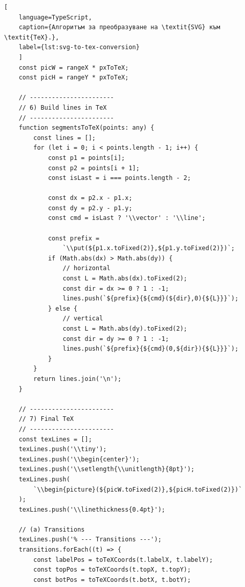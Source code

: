 \begin{lstlisting}[
	language=TypeScript,
	caption={Алгоритъм за преобразуване на \textit{SVG} към \textit{TeX}.},
	label={lst:svg-to-tex-conversion}
	]
    const picW = rangeX * pxToTeX;
    const picH = rangeY * pxToTeX;
    
    // -----------------------
    // 6) Build lines in TeX
    // -----------------------
    function segmentsToTeX(points: any) {
        const lines = [];
        for (let i = 0; i < points.length - 1; i++) {
            const p1 = points[i];
            const p2 = points[i + 1];
            const isLast = i === points.length - 2;
            
            const dx = p2.x - p1.x;
            const dy = p2.y - p1.y;
            const cmd = isLast ? '\\vector' : '\\line';
            
            const prefix = 
                `\\put(${p1.x.toFixed(2)},${p1.y.toFixed(2)})`;
            if (Math.abs(dx) > Math.abs(dy)) {
                // horizontal
                const L = Math.abs(dx).toFixed(2);
                const dir = dx >= 0 ? 1 : -1;
                lines.push(`${prefix}{${cmd}(${dir},0){${L}}}`);
            } else {
                // vertical
                const L = Math.abs(dy).toFixed(2);
                const dir = dy >= 0 ? 1 : -1;
                lines.push(`${prefix}{${cmd}(0,${dir}){${L}}}`);
            }
        }
        return lines.join('\n');
    }
    
    // -----------------------
    // 7) Final TeX
    // -----------------------
    const texLines = [];
    texLines.push('\\tiny');
    texLines.push('\\begin{center}');
    texLines.push('\\setlength{\\unitlength}{8pt}');
    texLines.push(
        `\\begin{picture}(${picW.toFixed(2)},${picH.toFixed(2)})`
    );
    texLines.push('\\linethickness{0.4pt}');
    
    // (a) Transitions
    texLines.push('% --- Transitions ---');
    transitions.forEach((t) => {
        const labelPos = toTeXCoords(t.labelX, t.labelY);
        const topPos = toTeXCoords(t.topX, t.topY);
        const botPos = toTeXCoords(t.botX, t.botY);
        

\end{lstlisting}
